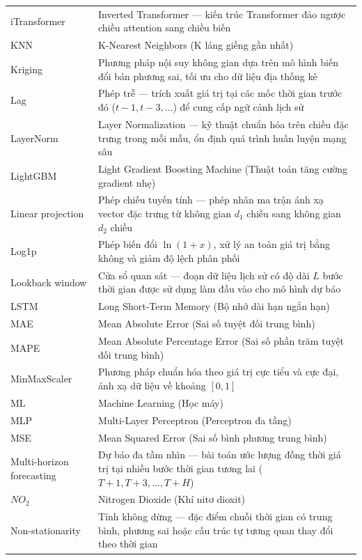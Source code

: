 \begin{longtable}{p{4.2cm} p{10.3cm}}
    iTransformer & Inverted Transformer --- kiến trúc Transformer đảo ngược chiều attention sang chiều biến \\
    KNN & K-Nearest Neighbors (K láng giềng gần nhất) \\
    Kriging & Phương pháp nội suy không gian dựa trên mô hình biến đổi bán phương sai, tối ưu cho dữ liệu địa thống kê \\
    Lag & Phép trễ --- trích xuất giá trị tại các mốc thời gian trước đó ($t{-}1, t{-}3, \ldots$) để cung cấp ngữ cảnh lịch sử \\
    LayerNorm & Layer Normalization --- kỹ thuật chuẩn hóa trên chiều đặc trưng trong mỗi mẫu, ổn định quá trình huấn luyện mạng sâu \\
    LightGBM & Light Gradient Boosting Machine (Thuật toán tăng cường gradient nhẹ) \\
    Linear projection & Phép chiếu tuyến tính --- phép nhân ma trận ánh xạ vector đặc trưng từ không gian $d_1$ chiều sang không gian $d_2$ chiều \\
    Log1p & Phép biến đổi $\ln(1 + x)$, xử lý an toàn giá trị bằng không và giảm độ lệch phân phối \\
    Lookback window & Cửa sổ quan sát --- đoạn dữ liệu lịch sử có độ dài $L$ bước thời gian được sử dụng làm đầu vào cho mô hình dự báo \\
    LSTM & Long Short-Term Memory (Bộ nhớ dài hạn ngắn hạn) \\
    MAE & Mean Absolute Error (Sai số tuyệt đối trung bình) \\
    MAPE & Mean Absolute Percentage Error (Sai số phần trăm tuyệt đối trung bình) \\
    MinMaxScaler & Phương pháp chuẩn hóa theo giá trị cực tiểu và cực đại, ánh xạ dữ liệu về khoảng $[0, 1]$ \\
    ML & Machine Learning (Học máy) \\
    MLP & Multi-Layer Perceptron (Perceptron đa tầng) \\
    MSE & Mean Squared Error (Sai số bình phương trung bình) \\
    Multi-horizon forecasting & Dự báo đa tầm nhìn --- bài toán ước lượng đồng thời giá trị tại nhiều bước thời gian tương lai ($T{+}1, T{+}3, \ldots, T{+}H$) \\
    $NO_2$ & Nitrogen Dioxide (Khí nitơ dioxit) \\
    Non-stationarity & Tính không dừng --- đặc điểm chuỗi thời gian có trung bình, phương sai hoặc cấu trúc tự tương quan thay đổi theo thời gian \\

\end{longtable}
